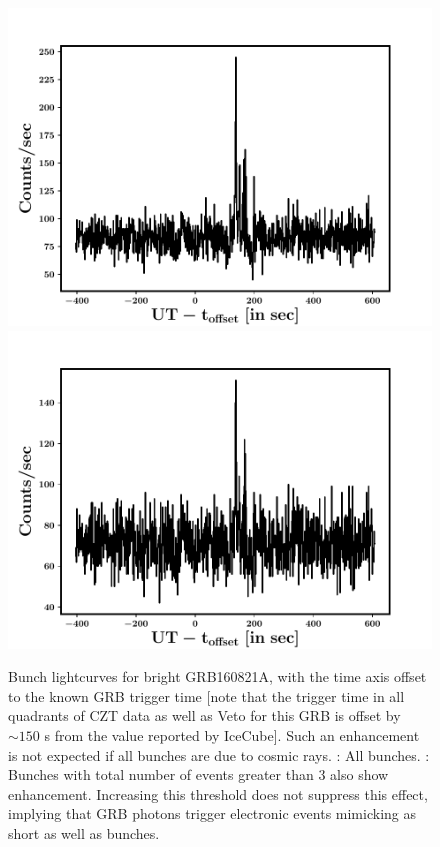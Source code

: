 \begin{figure}
\begin{center}
\includegraphics[scale=0.42]{GRB160821A--Q1--all_bunch_LC--1s}
\includegraphics[scale=0.42]{GRB160821A--Q1--Tg_bunch_LC--1s}
\caption[Enhancement of number of bunches during bright GRBs]{Bunch lightcurves for bright GRB160821A, with the time axis offset to the known GRB trigger time [note that the trigger time in all quadrants of CZT data as well as Veto for this GRB is offset by $\sim 150$ s from the value reported by IceCube]. Such an enhancement is not expected if all bunches are due to cosmic rays. \eL: All bunches. \eR: Bunches with total number of events greater than $3$ also show enhancement. Increasing this threshold does not suppress this effect, implying that GRB photons trigger electronic events mimicking as short as well as bunches.}
\label{fig:bunch_enhancement_during_bright_GRBs}
\end{center}
\end{figure}


